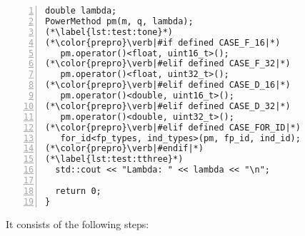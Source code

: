 \documentclass[10pt,a4paper]{article}
\theoremstyle{definition}\newtheorem{problem}{Problem}
\begin{document}
{\begin{lstlisting}[numbers=left,xleftmargin=2em]
double lambda;                                                        (* \label{lst:test:lam} *)
PowerMethod pm(m, q, lambda);                                         (* \label{lst:test:pm} *)
(*\label{lst:test:tone}*)
(*\color{prepro}\verb|#if defined CASE_F_16|*)                        (* \label{lst:test:pmab} *)
   pm.operator()<float, uint16_t>(); 
(*\color{prepro}\verb|#elif defined CASE_F_32|*)
   pm.operator()<float, uint32_t>(); 
(*\color{prepro}\verb|#elif defined CASE_D_16|*)
   pm.operator()<double, uint16_t>(); 
(*\color{prepro}\verb|#elif defined CASE_D_32|*)
   pm.operator()<double, uint32_t>();                                 (* \label{lst:test:pmam} *)
(*\color{prepro}\verb|#elif defined CASE_FOR_ID|*)
   for_id<fp_types, ind_types>(pm, fp_id, ind_id);                    (* \label{lst:test:pmafi} *)
(*\color{prepro}\verb|#endif|*)                                       (* \label{lst:test:pmae} *)
(*\label{lst:test:tthree}*)
  std::cout << "Lambda: " << lambda << "\n";                          (* \label{lst:test:print} *)

  return 0;
}
\end{lstlisting}
}
\noindent
It consists of the following steps:
\end{document}
